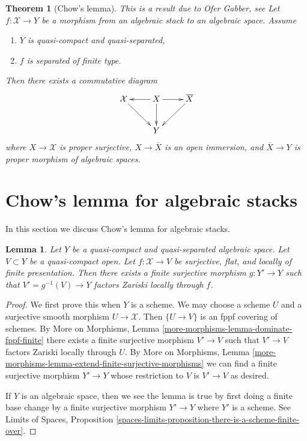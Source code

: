 \documentclass[10pt,a4paper]{amsart}
\theoremstyle{plain}
\newtheorem{theorem}[subsection]{Theorem}
\newtheorem{lemma}[subsection]{Lemma}
\theoremstyle{definition}
\theoremstyle{remark}
\numberwithin{equation}{subsection}
\newenvironment{reference}{}{}
\begin{document}
\begin{theorem}[Chow's lemma]
\label{theorem-chow-finite-type}
\begin{reference}
This is a result due to Ofer Gabber, see
\cite[Theorem 1.1]{olsson_proper}
\end{reference}
Let $f : \mathcal{X} \to Y$ be a morphism from an algebraic stack
to an algebraic space. Assume
\begin{enumerate}
\item $Y$ is quasi-compact and quasi-separated,
\item $f$ is separated of finite type.
\end{enumerate}
Then there exists a commutative diagram
$$
\xymatrix{
\mathcal{X} \ar[rd] & X \ar[l] \ar[d] \ar[r] & \overline{X} \ar[ld] \\
& Y
}
$$
where $X \to \mathcal{X}$ is proper surjective,
$X \to \overline{X}$ is an open immersion, and
$\overline{X} \to Y$ is proper morphism of algebraic spaces.
\end{theorem}

\section{Chow's lemma for algebraic stacks}
\label{section-chow}

\noindent
In this section we discuss Chow's lemma for algebraic stacks.

\begin{lemma}
\label{lemma-finite-cover-factor}
Let $Y$ be a quasi-compact and quasi-separated algebraic space.
Let $V \subset Y$ be a quasi-compact open. Let $f : \mathcal{X} \to V$
be surjective, flat, and locally of finite presentation.
Then there exists a finite surjective morphism $g : Y' \to Y$ such that
$V' = g^{-1}(V) \to Y$ factors Zariski locally through $f$.
\end{lemma}

\begin{proof}
We first prove this when $Y$ is a scheme.
We may choose a scheme $U$ and a surjective smooth morphism
$U \to \mathcal{X}$. Then $\{U \to V\}$ is an fppf covering of schemes.
By More on Morphisms, Lemma \ref{more-morphisms-lemma-dominate-fppf-finite}
there exists a finite surjective morphism
$V' \to V$ such that $V' \to V$ factors Zariski locally
through $U$. By
More on Morphisms, Lemma
\ref{more-morphisms-lemma-extend-finite-surjective-morphisms}
we can find a finite surjective morphism $Y' \to Y$
whose restriction to $V$ is $V' \to V$ as desired.

\medskip\noindent
If $Y$ is an algebraic space, then we see the lemma is true by
first doing a finite base change by a finite surjective morphism
$Y' \to Y$ where $Y'$ is a scheme. See
Limits of Spaces, Proposition
\ref{spaces-limits-proposition-there-is-a-scheme-finite-over}.
\end{proof}
\end{document}
